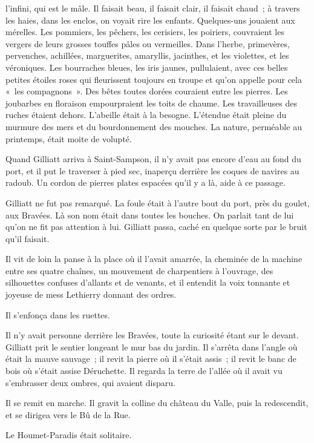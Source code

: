 \documentclass[french,twoside]{book} %
\begin{document}
l’infini, qui est le mâle. Il faisait beau, il faisait clair, il faisait chaud ; à travers les haies, dans les enclos, on voyait rire les enfants. Quelques-uns jouaient aux mérelles. Les pommiers, les pêchers, les cerisiers, les poiriers, couvraient les vergers de leurs grosses touffes pâles ou vermeilles. Dans l’herbe, primevères, pervenches, achillées, marguerites, amaryllis, jacinthes, et les violettes, et les véroniques. Les bourraches bleues, les iris jaunes, pullulaient, avec ces belles petites étoiles roses qui fleurissent toujours en troupe et qu’on appelle pour cela « les compagnons ». Des bêtes toutes dorées couraient entre les pierres. Les joubarbes en floraison empourpraient les toits de chaume. Les travailleuses des ruches étaient dehors. L’abeille était à la besogne. L’étendue était pleine du murmure des mers et du bourdonnement des mouches. La nature, perméable au printemps, était moite de volupté.\par
Quand Gilliatt arriva à Saint-Sampson, il n’y avait  pas encore d’eau au fond du port, et il put le traverser à pied sec, inaperçu derrière les coques de navires au radoub. Un cordon de pierres plates espacées qu’il y a là, aide à ce passage.\par
Gilliatt ne fut pas remarqué. La foule était à l’autre bout du port, près du goulet, aux Bravées. Là son nom était dans toutes les bouches. On parlait tant de lui qu’on ne fit pas attention à lui. Gilliatt passa, caché en quelque sorte par le bruit qu’il faisait.\par
Il vit de loin la panse à la place où il l’avait amarrée, la cheminée de la machine entre ses quatre chaînes, un mouvement de charpentiers à l’ouvrage, des silhouettes confuses d’allants et de venants, et il entendit la voix tonnante et joyeuse de mess Lethierry donnant des ordres.\par
Il s’enfonça dans les ruettes.\par
Il n’y avait personne derrière les Bravées, toute la curiosité étant sur le devant. Gilliatt prit le sentier longeant le mur bas du jardin. Il s’arrêta dans l’angle où était la mauve sauvage ; il revit la pierre où il s’était assis ; il revit le banc de bois où s’était assise Déruchette. Il regarda la terre de l’allée où il avait vu s’embrasser deux ombres, qui avaient disparu.\par
Il se remit en marche. Il gravit la colline du château du Valle, puis la redescendit, et se dirigea vers le Bû de la Rue.\par
Le Houmet-Paradis était solitaire.\par
\end{document}
